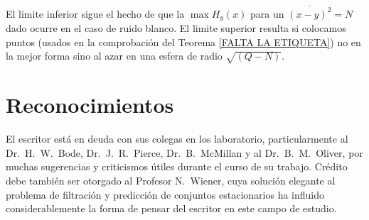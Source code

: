 El limite inferior sigue el hecho de que la $\max H_{y}(x)$ para un
$\overline{(x - y)^{2}} = N$ dado ocurre en el caso de ruido
blanco. El limite superior resulta si colocamos puntos (usados en la
comprobaci\'on del Teorema \ref{FALTA LA ETIQUETA}) no en la mejor
forma sino al azar en una esfera de radio $\sqrt{(Q - N)}$.

\section*{Reconocimientos}

El escritor est\'{a} en deuda con sus colegas en los laboratorio,
particularmente al Dr.\ H.\ W.\ Bode, Dr.\ J.\ R.\ Pierce,
Dr.\ B.\ McMillan y al Dr.\ B.\ M.\ Oliver, por muchas sugerencias y
criticismos \'utiles durante el curso de su trabajo. Cr\'{e}dito debe
tambi\'en ser otorgado al Profesor N.\ Wiener, cuya soluci\'on elegante
al problema de filtraci\'on y predicci\'on de conjuntos estacionarios
ha influido considerablemente la forma de pensar del escritor en este
campo de estudio.


